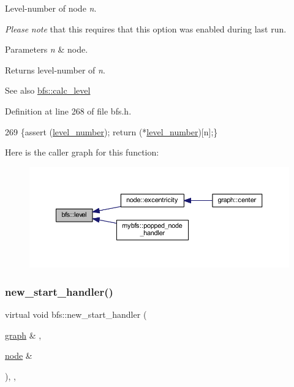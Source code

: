 Level-\/number of node {\itshape n}. 

{\itshape Please} {\itshape note} that this requires that this option was enabled during last run.


\begin{DoxyParams}{Parameters}
{\em n} & node. \\
\hline
\end{DoxyParams}
\begin{DoxyReturn}{Returns}
level-\/number of {\itshape n}. 
\end{DoxyReturn}
\begin{DoxySeeAlso}{See also}
\mbox{\hyperlink{classbfs_a491515da4eb8efca0be4fef0df350a8e}{bfs\+::calc\+\_\+level}} 
\end{DoxySeeAlso}


Definition at line 268 of file bfs.\+h.


\begin{DoxyCode}
269     \{assert (\mbox{\hyperlink{classbfs_aab92e9d128612c28324aafe4750dbc84}{level\_number}}); \textcolor{keywordflow}{return} (*\mbox{\hyperlink{classbfs_aab92e9d128612c28324aafe4750dbc84}{level\_number}})[n];\}
\end{DoxyCode}
Here is the caller graph for this function\+:
\nopagebreak
\begin{figure}[H]
\begin{center}
\leavevmode
\includegraphics[width=350pt]{classbfs_ac0158a0453fb17a89be4049d21db56b1_icgraph}
\end{center}
\end{figure}
\mbox{\label{classbfs_ab89a3d1cb36b20a86837b0345063e4b1}} 
\subsubsection{\texorpdfstring{new\+\_\+start\+\_\+handler()}{new\_start\_handler()}}
{\footnotesize\ttfamily virtual void bfs\+::new\+\_\+start\+\_\+handler (\begin{DoxyParamCaption}\item[{\mbox{\hyperlink{classgraph}{graph}} \&}]{,  }\item[{\mbox{\hyperlink{classnode}{node}} \&}]{ }\end{DoxyParamCaption})\hspace{0.3cm}{\ttfamily [inline]}, {\ttfamily [virtual]}, {\ttfamily [inherited]}}



